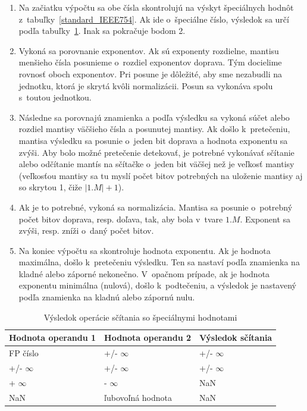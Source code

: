 \begin{enumerate}  
\item Na začiatku výpočtu sa obe čísla skontrolujú na výskyt špeciálnych hodnôt z~tabuľky~\ref{standard_IEEE754}. Ak ide o~špeciálne číslo, výsledok sa určí podľa tabuľky~\ref{special_plus}. Inak sa pokračuje bodom 2.

\item Vykoná sa porovnanie exponentov. Ak sú exponenty rozdielne, mantisu menšieho čísla posunieme o~rozdiel exponentov doprava. Tým docielime rovnosť oboch exponentov. Pri posune je dôležité, aby sme nezabudli na jednotku, ktorá je skrytá kvôli normalizácii. Posun sa vykonáva spolu s~toutou jednotkou. 

\item Následne sa porovnajú znamienka a podľa výsledku sa vykoná súčet alebo rozdiel mantisy väčšieho čísla a posunutej mantisy. Ak došlo k~pretečeniu, mantisa výsledku sa posunie o~jeden bit doprava a hodnota exponentu sa zvýši. Aby bolo možné pretečenie detekovať, je potrebné vykonávať sčítanie alebo odčítanie mantís na sčítačke o~jeden bit väčšej než je veľkosť mantisy (veľkosťou mantisy sa tu myslí počet bitov potrebných na uloženie mantisy aj so skrytou 1, čiže $ |1.M| + 1 $).

\item Ak je to potrebné, vykoná sa normalizácia. Mantisa sa posunie o~potrebný počet bitov doprava, resp. doľava, tak, aby bola v~tvare $ 1.M $. Exponent sa zvýši, resp. zníži o~daný počet bitov.

\item Na koniec výpočtu sa skontroluje hodnota exponentu. Ak je hodnota maximálna, došlo k~pretečeniu výsledku. Ten sa nastaví podľa znamienka na kladné alebo záporné nekonečno. V~opačnom prípade, ak je hodnota exponentu minimálna (nulová), došlo k~podtečeniu, a výsledok je nastavený podľa znamienka na kladnú alebo zápornú nulu.
\end{enumerate}


\begin{table}[h]
\centering
\begin{tabular}{|l|l|l|}
\hline
\rowcolor[HTML]{68CBD0} 
Hodnota operandu 1 & Hodnota operandu 2 & Výsledok sčítania \\ \hline
FP číslo           & +/- $ \infty $     & +/- $ \infty $    \\ \hline
+/- $ \infty $     & +/- $ \infty $     & +/- $ \infty $    \\ \hline
+ $ \infty $       & - $ \infty $       & NaN               \\ \hline
NaN                & ľubovoľná hodnota  & NaN               \\ \hline
\end{tabular}
\caption{Výsledok operácie sčítania so špeciálnymi hodnotami}
\label{special_plus}
\end{table}

